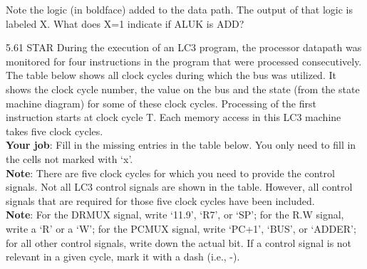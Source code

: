 \documentclass{patt}
\begin{document}
\begin{exercises}
Note the logic (in boldface) added to the data path. The output of that logic is labeled X.  What does X=1 indicate if ALUK is ADD?

\FloatBarrier

\item[5.61]STAR During the execution of an LC3 program, the processor datapath was monitored for four instructions in
the program that were processed consecutively. The table below shows all clock cycles during which 
the bus was utilized. It shows the clock cycle number, the value on the bus and the state 
(from the state machine diagram) for some of these clock cycles. Processing of the first instruction 
starts at clock cycle T. Each memory access in this LC3 machine takes five clock cycles.\\

\noindent
\textbf{Your job}: Fill in the missing entries in the table below. You only need to fill in the cells not marked with `x'. \\

\noindent
\textbf{Note}: There are five clock cycles for which you need to provide the control signals. Not all LC3 
control signals are shown in the table. However, all control signals that are required for those five 
clock cycles have been included. \\

\noindent
\textbf{Note}: For the DRMUX signal, write `11.9', `R7', or `SP'; for the R.W signal, write a `R' or a `W'; for the PCMUX signal, write `PC+1', `BUS', or `ADDER'; for all other control signals, write down the actual bit. If a control signal is not relevant in a given cycle, mark it with a dash (i.e., -).  \\


\end{exercises}
\end{document}
